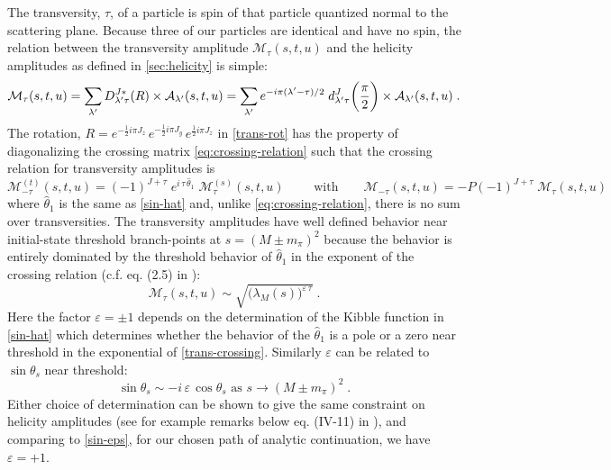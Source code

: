 The transversity, \(\tau\), of a particle is spin of that particle quantized normal to the scattering plane. Because three of our particles are identical and have no spin, the relation between the transversity amplitude \(\mathcal{M}_\tau(s,t,u)\) and the helicity amplitudes as defined in \cref{sec:helicity} is simple:
  \begin{equation} \label{trans-rot}
    \mathcal{M}_\tau (s,t,u) = \sum_{\lambda^\prime} D_{{\lambda^\prime} \tau}^{J*}(R) \times \mathcal{A}_{\lambda^\prime}(s,t,u)
    = \sum_{{\lambda^\prime}} e^{- i \pi ({\lambda^\prime} - \tau) /2} \; d^J_{{\lambda^\prime} \tau}\bigg(\frac{\pi}{2}\bigg) \times \mathcal{A}_{\lambda^\prime}(s,t,u) \; .
    \end{equation}
The rotation, \(R = e^{-\frac{1}{2} i \pi J_z}\, e^{-\frac{1}{2} i \pi J_y} \, e^{\frac{1}{2} i \pi J_z}\) in \cref{trans-rot} has the property of diagonalizing the crossing matrix \cref{eq:crossing-relation} such that the crossing relation for transversity amplitudes is
  \begin{equation}
    \label{trans-crossing}
    \mathcal{M}^{(t)}_{-\tau}(s,t,u) = (-1)^{J+\tau} \; e^{i \, \tau \, \hat{\theta}_1} \; \mathcal{M}^{(s)}_\tau(s,t,u)
    \qquad \text{ with} \qquad
    \mathcal{M}_{-\tau}(s,t,u) = - P(-1)^{J+\tau} \; \mathcal{M}_\tau(s,t,u)
  \end{equation}
where \(\hat{\theta}_1\) is the same as \cref{sin-hat} and, unlike \cref{eq:crossing-relation}, there is no sum over transversities.
The transversity amplitudes have well defined behavior near initial-state threshold branch-points at \(s= (M\pm m_\pi)^2\) because the behavior is entirely dominated by the threshold behavior of \(\hat{\theta}_1\) in the exponent of the crossing relation (c.f. eq. (2.5) in \cite{Kotanski1968}):
  \begin{equation} \label{trans-constraint}
    \mathcal{M}_\tau(s,t,u) \sim \sqrt{\big(\lambda_M(s)\big)^{\varepsilon \, \tau}}\; .
  \end{equation}
Here the factor \(\varepsilon = \pm 1\) depends on the determination of the Kibble function in \cref{sin-hat} which determines whether the behavior of the \(\hat{\theta}_1\) is a pole or a zero near threshold in the exponential of \cref{trans-crossing}. Similarly \(\varepsilon\) can be related to \(\sin \theta_s\) near threshold:
  \begin{equation} \label{epsilon_sin}
    \sin \theta_s \sim - i  \,\varepsilon \, \cos \theta_s \text{ as } s \to (M \pm m_\pi)^2 \; .
  \end{equation}
 Either choice of determination can be shown to give the same constraint on helicity amplitudes (see for example remarks below eq. (IV-11) in \cite{Cohen-Tannoudji1968}), and comparing to \cref{sin-eps}, for our chosen path of analytic continuation, we have \(\varepsilon = +1\).

